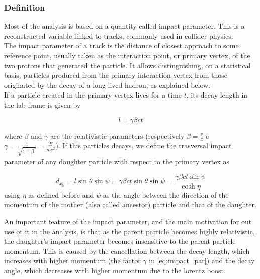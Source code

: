 \subsubsection{Definition}
\label{subsubsec:th_impact_par}

Most of the analysis is based on a quantity called impact parameter.
This is a reconstructed variable linked to tracks, commonly used in collider physics.\\

The impact parameter of a track is the distance of closest approach to some reference point, usually taken as the interaction point, or primary vertex, of the two protons that generated the particle. 
It allows distinguishing, on a statistical basis, particles produced from the primary interaction vertex from those originated by the decay of a long-lived hadron, as explained below.\\

If a particle created in the primary vertex lives for a time $t$, its decay length in the lab frame is given by

\begin{equation}
	l = \gamma\beta c t
	\label{eq:decay_length}
\end{equation}

where $\beta$ and $\gamma$ are the relativistic parameters (respectively $\beta = \frac{v}{c}$ e $\gamma = \frac{1}{\sqrt{1-\beta^2}} = \frac{E}{m c^2}$).
If this particles decays, we define the trasversal impact parameter of any daughter particle with respect to the primary vertex as 

\begin{equation}
	d_{xy} = l\sin{\theta}\sin{\psi} = \gamma\beta c t\sin{\theta}\sin{\psi} = \frac{\gamma\beta c t\sin{\psi}}{\cosh{\eta}}
	\label{eq:impact_par}
\end{equation}
using $\eta$ as defined before and $\psi$ as the angle between the direction of the momentum of the mother (also called ancestor) particle and that of the daughter.


An important feature of the impact parameter, and the main motivation for out use ot it in the analysis, is that as the parent particle becomes highly relativistic, the daughter's impact parameter becomes insensitive to the parent particle momentum.
This is caused by the cancellation between the decay length, which increases with higher momentum (the factor $\gamma$ in \ref{eq:impact_par}) and the decay angle, which decreases with higher momentum due to the lorentz boost.

